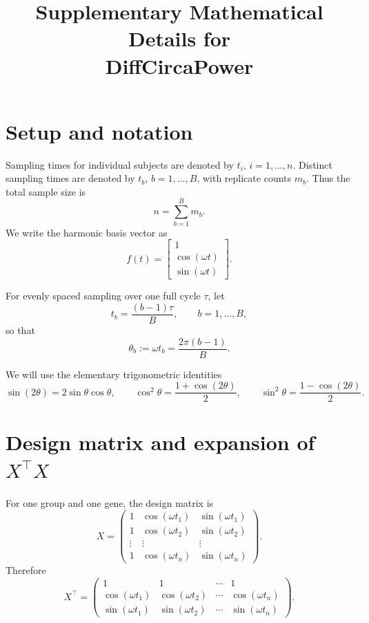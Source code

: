 \documentclass[11pt]{article}
\title{Supplementary Mathematical Details for\\DiffCircaPower}
\author{}
\date{}
\begin{document}
\maketitle

\section{Setup and notation}

Sampling times for individual subjects are denoted by $t_i$, $i=1,\dots,n$.
Distinct sampling times are denoted by $t_b$, $b=1,\dots,B$, with replicate counts $m_b$.
Thus the total sample size is
\begin{equation}
n=\sum_{b=1}^B m_b.
\label{eq:budget}
\end{equation}
We write the harmonic basis vector as
\begin{equation}
f(t)=\begin{bmatrix}1\\ \cos(\omega t)\\ \sin(\omega t)\end{bmatrix}.
\label{eq:basis}
\end{equation}

For evenly spaced sampling over one full cycle $\tau$, let
\begin{equation}
t_b=\frac{(b-1)\tau}{B},\qquad b=1,\dots,B,
\label{eq:even_times}
\end{equation}
so that
\begin{equation}
\theta_b:=\omega t_b=\frac{2\pi(b-1)}{B}.
\label{eq:theta_def}
\end{equation}

We will use the elementary trigonometric identities
\begin{equation}
\sin(2\theta)=2\sin\theta\cos\theta,
\qquad
\cos^2\theta=\frac{1+\cos(2\theta)}{2},
\qquad
\sin^2\theta=\frac{1-\cos(2\theta)}{2}.
\label{eq:trig_identities}
\end{equation}

\section{Design matrix and expansion of \texorpdfstring{$X^\top X$}{X'X}}

For one group and one gene, the design matrix is
\[
X=
\begin{pmatrix}
1 & \cos(\omega t_1) & \sin(\omega t_1)\\
1 & \cos(\omega t_2) & \sin(\omega t_2)\\
\vdots & \vdots & \vdots\\
1 & \cos(\omega t_n) & \sin(\omega t_n)
\end{pmatrix}.
\]
Therefore
\[
X^\top=
\begin{pmatrix}
1 & 1 & \cdots & 1\\
\cos(\omega t_1) & \cos(\omega t_2) & \cdots & \cos(\omega t_n)\\
\sin(\omega t_1) & \sin(\omega t_2) & \cdots & \sin(\omega t_n)
\end{pmatrix}.
\]
\end{document}
